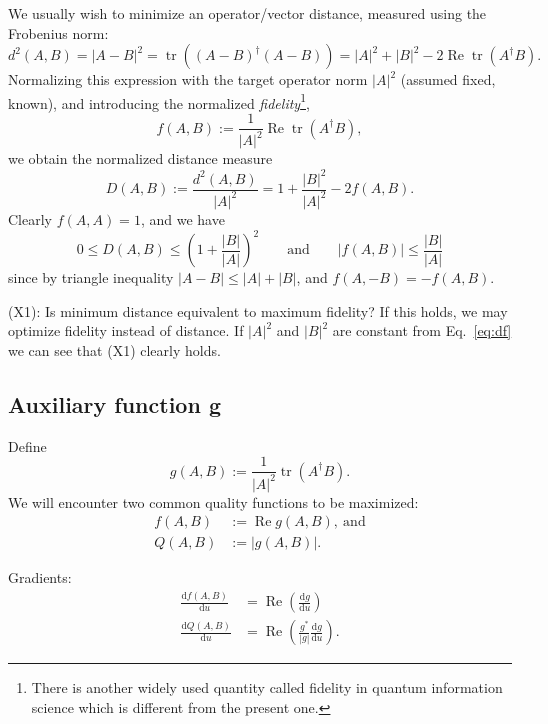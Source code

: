 \documentclass[aps, pra, a4paper, longbibliography]{revtex4}
\newcommand{\be}{\begin{equation}}
\newcommand{\ee}{\end{equation}}
\DeclareMathOperator{\tr}{tr}
\DeclareMathOperator{\re}{Re}
\newcommand{\dd}[2]{\frac{\mathrm{d} #1}{\mathrm{d} #2}}
\begin{document}
We usually wish to minimize an operator/vector distance, measured using the Frobenius norm:
\be
d^2(A, B) = |A-B|^2 = \tr((A-B)^\dagger (A-B))
= |A|^2 +|B|^2 -2 \re \tr(A^\dagger B).
\ee
Normalizing this expression with the target operator norm $|A|^2$ (assumed fixed, known),
and introducing the normalized \emph{fidelity}\footnote{
There is another widely used quantity called fidelity in quantum information science which is different from the present one.},
\be
f(A, B) := \frac{1}{|A|^2} \re \tr(A^\dagger B),
\ee
we obtain the normalized distance measure
\be
\label{eq:df}
D(A,B)
:= \frac{d^2(A, B)}{|A|^2}
= 1 +\frac{|B|^2}{|A|^2} -2 f(A, B).
\ee
Clearly $f(A, A) = 1$, and we have
\be
0 \le D(A, B) \le \left(1 + \frac{|B|}{|A|} \right)^2
\qquad \text{and} \qquad
|f(A, B)|
\le \frac{|B|}{|A|}
\ee
since by triangle inequality $|A-B| \le |A|+|B|$,
and $f(A, -B) = -f(A, B)$.


(X1): Is minimum distance equivalent to maximum fidelity?
If this holds, we may optimize fidelity instead of distance.
If $|A|^2$ and $|B|^2$ are constant
from Eq.~\eqref{eq:df} we can see that (X1) clearly holds.



\subsection{Auxiliary function g}

Define
\be
g(A, B) := \frac{1}{|A|^2} \tr(A^\dagger B).
\ee
We will encounter two common quality functions to be maximized:
\begin{align}
f(A,B) &:= \re g(A,B), \: \text{and}\\
Q(A,B) &:= |g(A,B)|.
\end{align}

Gradients:
\begin{align}
\dd{f(A,B)}{u}
&= \re \left( \dd{g}{u} \right) \\
\dd{Q(A,B)}{u}
&= \re \left(\frac{g^*}{|g|} \dd{g}{u} \right).
\end{align}
\end{document}

